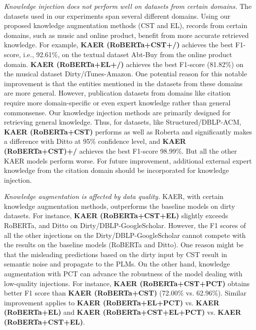 \textit{Knowledge injection does not perform well on datasets from certain domains.}
The datasets used in our experiments span several different domains. Using our proposed knowledge augmentation methods (CST and EL), records from certain domains, such as music and online product, benefit from more accurate retrieved knowledge.
For example, \textbf{KAER (RoBERTa+CST+/)} achieves the best F1-score, i.e., 92.61\%, on the textual dataset Abt-Buy from the online product domain.
\textbf{KAER (RoBERTa+EL+/)} achieves the best F1-score (81.82\%) on the musical dataset Dirty/iTunes-Amazon. %
One potential reason for this notable improvement is that the entities mentioned in the datasets from these domains are more general.
However, publication datasets from domains like citation require more domain-specific or even expert knowledge rather than general commonsense. Our knowledge injection methods are primarily designed for retrieving general knowledge.
Thus, for datasets, like Structured/DBLP-ACM, \textbf{KAER (RoBERTa+CST)} performs as well as Roberta and significantly makes a difference with Ditto at 95\% confidence level, and \textbf{KAER (RoBERTa+CST)+/}  achieves the best F1-score 98.99\%. But all the other KAER models perform worse. For future improvement, additional external expert knowledge from the citation domain should be incorporated for knowledge injection. 

\textit{Knowledge augmentation is affected by data quality.}
KAER, with certain knowledge augmentation methods, outperforms the baseline models on dirty datasets. For instance, \textbf{KAER (RoBERTa+CST+EL)} slightly exceeds RoBERTa, and Ditto on Dirty/DBLP-GoogleScholar.
However, the F1 scores of all the other injections on the Dirty/DBLP-GoogleScholar cannot compete with the results on the baseline models (RoBERTa and Ditto). One reason might be that the misleading predictions based on the dirty input by CST result in semantic noise and propagate to the PLMs.
On the other hand, knowledge augmentation with PCT can advance the robustness of the model dealing with low-quality injections. For instance, \textbf{KAER (RoBERTa+CST+PCT)} obtains better F1 score than \textbf{KAER (RoBERTa+CST)} (72.00\% vs. 62.96\%). 
Similar improvement applies to \textbf{KAER (RoBERTa+EL+PCT)} vs. \textbf{KAER (RoBERTa+EL)} %
and  \textbf{KAER (RoBERTa+CST+EL+PCT)} vs. \textbf{KAER (RoBERTa+CST+EL)}. %

